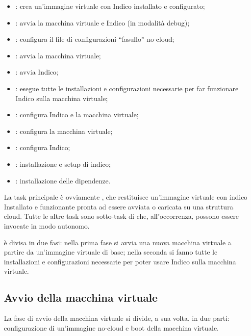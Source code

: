         \begin{itemize}
            \item {}: crea un'immagine virtuale con Indico installato e configurato;
            \item {}: avvia la macchina virtuale e Indico (in modalità debug);
            \item {}: configura il file di configurazioni ``fasullo'' no-cloud;
            \item {}: avvia la macchina virtuale;
            \item {}: avvia Indico;
            \item {}: esegue tutte le installazioni e configurazioni necessarie per far funzionare Indico sulla macchina virtuale;
            \item {}: configura Indico e la macchina virtuale;
            \item {}: configura la macchina virtuale;
            \item {}: configura Indico;
            \item {}: installazione e setup di indico;
            \item {}: installazione delle dipendenze.
        \end{itemize}
        
        La task principale è ovviamente , che restituisce un'immagine virtuale con indico Installato e funzionante pronta ad essere avviata o caricata su una struttura cloud. Tutte le altre task sono sotto-task di  che, all'occorrenza, possono essere invocate in modo autonomo.
        
         è divisa in due fasi: nella prima fase si avvia una nuova macchina virtuale a partire da un'immagine virtuale di base; nella seconda si fanno tutte le installazioni e configurazioni necessarie per poter usare Indico sulla macchina virtuale.
        
        \subsection{Avvio della macchina virtuale} \label{subsec:cd;civ;avvio_macchina_virtuale}
        
            La fase di avvio della macchina virtuale si divide, a sua volta, in due parti: configurazione di un'immagine  no-cloud e boot della macchina virtuale.
            
